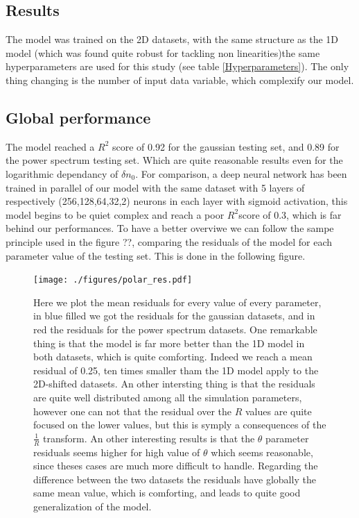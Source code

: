 \documentclass[11pt,a4paper,openany]{report}
\begin{document}
\begin{multicols}{2}
    \section{Results}
    The model was trained on the 2D datasets, with the same structure as the 1D model (which was found quite robust for tackling non linearities)the same hyperparameters are used for this study (see table \ref{Hyperparameters}). The only thing changing is the number of input data variable, which complexify our model.

    \subsection{Global performance}
    The model reached a $R^2$ score of 0.92 for the gaussian testing set, and 0.89 for the power spectrum testing set. Which are quite reasonable results even for the logarithmic dependancy of $\delta n_0$. For comparison, a deep neural network has been trained in parallel of our model with the same dataset with 5 layers of respectively (256,128,64,32,2) neurons in each layer with sigmoid activation, this model begins to be quiet complex and reach a poor $R^2$score of 0.3, which is far behind our performances. To have a better overviwe we can follow the sampe principle used in the figure ??, comparing the residuals of the model for each parameter value of the testing set. This is done in the following figure.
\end{multicols}
\begin{figure}[H]
    \centering
    \texttt{[image: ./figures/polar\_res.pdf]}
    \vspace*{.5cm}
    \caption{Here we plot the mean residuals for every value of every parameter, in blue filled we got the residuals for the gaussian datasets, and in red the residuals for the power spectrum datasets. One remarkable thing is that the model is far more better than the 1D model in both datasets, which is quite comforting. Indeed we reach a mean residual of 0.25, ten times smaller tham the 1D model apply to the 2D-shifted datasets. An other intersting thing is that the residuals are quite well distributed among all the simulation parameters, however one can not that the residual over the $R$ values are quite focused on the lower values, but this is symply a consequences of the $\frac{1}{R}$ transform. An other interesting results is that the $\theta$ parameter residuals seems higher for high value of $\theta$ which seems reasonable, since theses cases are much more difficult to handle. Regarding the difference between the two datasets the residuals have globally the same mean value, which is comforting, and leads to quite good generalization of the model.}
\end{figure}
\end{document}
